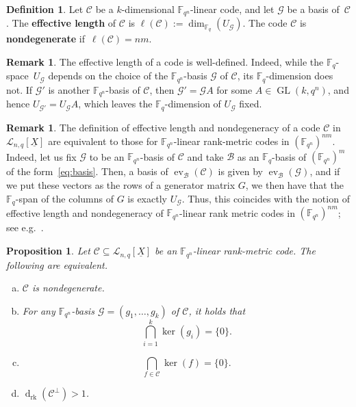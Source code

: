 \documentclass[11pt]{article}
\newtheorem{prop}[theo]{Proposition}
\theoremstyle{definition}
\newtheorem{defi}[theo]{Definition}
\newtheorem{rema}[theo]{Remark}
\numberwithin{equation}{section}
\DeclareMathOperator{\GL}{GL}
\DeclareMathOperator{\ev}{ev}
\DeclareMathOperator{\rk}{rk}
\DeclareMathOperator{\dd}{d}
\begin{document}
\begin{defi}
 Let $\mathcal{C}$ be a $k$-dimensional ${\mathbb F}_{q^n}$-linear code, and let $\mathcal{G}$ be a basis of~$\mathcal{C}$.  The  \textbf{effective length} of  $\mathcal{C}$ is $\ell(\mathcal{C}):=\dim_{\mathbb{F}_q}(U_{\mathcal{G}})$. 
The code $\mathcal{C}$ is \textbf{nondegenerate} if~$\ell(\mathcal{C})=nm$. 
\end{defi}

\begin{rema}
 The effective length of a code is well-defined. Indeed, while the $\mathbb{F}_q$-space~$U_{\mathcal{G}}$ depends on the choice of the ${\mathbb F}_{q^n}$-basis $\mathcal{G}$ of $\mathcal{C}$, its $\mathbb{F}_q$-dimension does not. If $\mathcal{G}'$ is another ${\mathbb F}_{q^n}$-basis of $\mathcal{C}$, then ${\mathcal{G}'}={\mathcal{G}}A$ for some $A\in \GL(k,q^n)$, and hence $U_{\mathcal{G}'}=U_{\mathcal{G}}A$, which leaves the $\mathbb{F}_q$-dimension of $U_{\mathcal{G}}$ fixed.  
\end{rema}

\begin{rema}
 The definition of effective length and nondegeneracy of a code $\mathcal{C}$ in~$\mathcal{L}_{n,q}[\underline{X}]$ are equivalent to those for ${\mathbb F}_{q^n}$-linear rank-metric codes in $(\mathbb{F}_{q^n})^{nm}$. Indeed, let us fix $\mathcal{G}$ to be an ${\mathbb F}_{q^n}$-basis of $\mathcal{C}$  and take $\mathcal{B}$ as an $\mathbb{F}_q$-basis of $({\mathbb F}_{q^n})^m$ of the form~\eqref{eq:basis}. Then, a basis of $\ev_{\mathcal{B}}(\mathcal{C})$ is given by $\ev_{\mathcal{B}}(\mathcal{G})$, and if we put these vectors as the rows of a generator matrix $G$, we then have that  the $\mathbb{F}_q$-span of the columns of $G$ is exactly $U_{\mathcal{G}}$. Thus, this coincides with the notion of effective length and nondegeneracy of ${\mathbb F}_{q^n}$-linear rank metric codes in $(\mathbb{F}_{q^n})^{nm}$; see e.g.~\cite{ABNR22}.
\end{rema}

\begin{prop}\label{prop:nondegenerate}
Let $\mathcal{C}\subseteq \mathcal{L}_{n,q}[\underline{X}]$ be an ${\mathbb F}_{q^n}$-linear rank-metric code. The following are equivalent.
 \begin{enumerate}[(a)]
\item  $\mathcal{C}$ is nondegenerate.
\item For any ${\mathbb F}_{q^n}$-basis $\mathcal G=(g_1,\ldots, g_k)$  of $\mathcal{C}$, it holds that $$ \bigcap_{i=1}^k\ker(g_i)=\{0\}.$$
\item $$ \bigcap_{f\in\mathcal{C}}\ker(f)=\{0\}.$$ 
 \item $ \dd_{\rk}(\mathcal{C}^\perp)>1$.
 \end{enumerate}
\end{prop}
\end{document}
